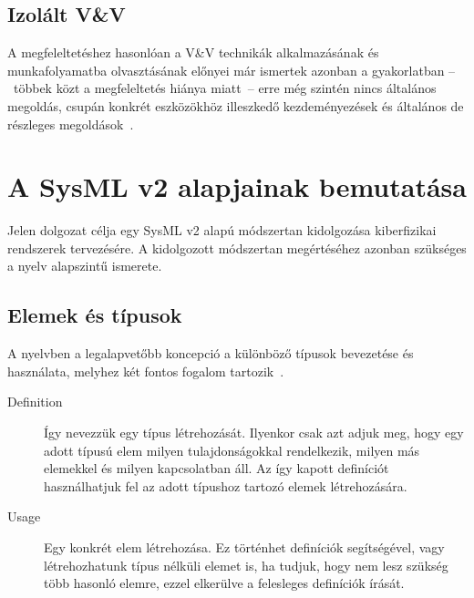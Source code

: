     \subsection{Izolált V\&V}
    A megfeleltetéshez hasonlóan a V\&V technikák alkalmazásának és munkafolyamatba olvasztásának előnyei már ismertek azonban a gyakorlatban --~többek közt a megfeleltetés hiánya miatt~-- erre még szintén nincs általános megoldás, csupán konkrét eszközökhöz illeszkedő kezdeményezések és általános de részleges megoldások~\cite{Ma_2022}.

\section{A SysML v2 alapjainak bemutatása}
Jelen dolgozat célja egy SysML v2 alapú módszertan kidolgozása kiberfizikai rendszerek tervezésére.
A kidolgozott módszertan megértéséhez azonban szükséges a nyelv alapszintű ismerete.

    \subsection{Elemek és típusok}
    A nyelvben a legalapvetőbb koncepció a különböző típusok bevezetése és használata, melyhez két fontos fogalom tartozik~\cite{Bajaj_2022}.
    \begin{description}
        \item[Definition] Így nevezzük egy típus létrehozását. Ilyenkor csak azt adjuk meg, hogy egy adott típusú elem milyen tulajdonságokkal rendelkezik, milyen más elemekkel és milyen kapcsolatban áll. Az így kapott definíciót használhatjuk fel az adott típushoz tartozó elemek létrehozására.
        \item[Usage] Egy konkrét elem létrehozása. Ez történhet definíciók segítségével, vagy létrehozhatunk típus nélküli elemet is, ha tudjuk, hogy nem lesz szükség több hasonló elemre, ezzel elkerülve a felesleges definíciók írását.
    \end{description}

